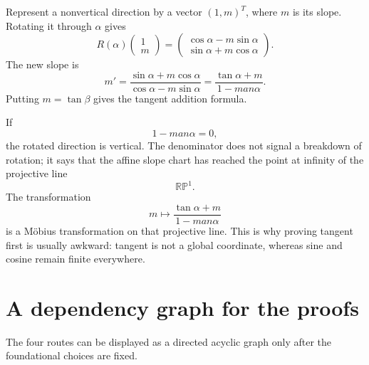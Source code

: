 Represent a nonvertical direction by a vector \((1,m)^T\), where \(m\) is its slope.  Rotating it through \(\alpha\) gives
\[
  R(\alpha)
  \begin{pmatrix}1\\m\end{pmatrix}
  =
  \begin{pmatrix}
    \cos\alpha-m\sin\alpha\\
    \sin\alpha+m\cos\alpha
  \end{pmatrix}.
\]
The new slope is
\[
  m'
  =
  \frac{\sin\alpha+m\cos\alpha}
  {\cos\alpha-m\sin\alpha}
  =
  \frac{\tan\alpha+m}
  {1-m	an\alpha}.
\]
Putting \(m=\tan\beta\) gives the tangent addition formula.

If
\[
  1-m	an\alpha=0,
\]
the rotated direction is vertical.  The denominator does not signal a breakdown of rotation; it says that the affine slope chart has reached the point at infinity of the projective line
\[
  \mathbb{RP}^1.
\]
The transformation
\[
  m\longmapsto
  \frac{\tan\alpha+m}{1-m	an\alpha}
\]
is a M\"obius transformation on that projective line.  This is why proving tangent first is usually awkward: tangent is not a global coordinate, whereas sine and cosine remain finite everywhere.

\section{A dependency graph for the proofs}

The four routes can be displayed as a directed acyclic graph only after the foundational choices are fixed.

